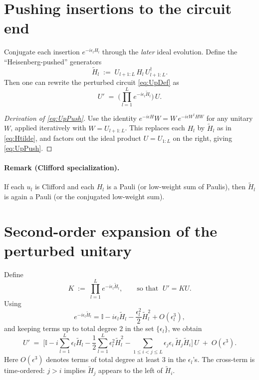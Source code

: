 \documentclass[11pt]{article}
\newcommand{\id}{\mathbb{I}}
\begin{document}
\section{Pushing insertions to the circuit end}

Conjugate each insertion $e^{-i\epsilon_l H_l}$ through the \emph{later} ideal evolution. Define the ``Heisenberg-pushed'' generators
\begin{equation}
\widetilde H_l \;:=\; U_{l+1:L}\, H_l \, U_{l+1:L}^\dagger.
\label{eq:Htilde}
\end{equation}
Then one can rewrite the perturbed circuit \eqref{eq:UpDef} as
\begin{equation}
\boxed{
U' \;=\; \Big(\prod_{l=1}^{L} e^{-i\epsilon_l \widetilde H_l}\Big)\, U.
}
\label{eq:UpPush}
\end{equation}

\begin{proof}[Derivation of \eqref{eq:UpPush}]
Use the identity $e^{-i\epsilon H}W = W\,e^{-i\epsilon W^\dagger H W}$ for any unitary $W$, applied iteratively with $W=U_{l+1:L}$. This replaces each $H_l$ by $\widetilde H_l$ as in \eqref{eq:Htilde}, and factors out the ideal product $U=U_{1:L}$ on the right, giving \eqref{eq:UpPush}.
\end{proof}

\paragraph{Remark (Clifford specialization).}
If each $u_l$ is Clifford and each $H_l$ is a Pauli (or low-weight sum of Paulis), then $\widetilde H_l$ is again a Pauli (or the conjugated low-weight sum).

\section{Second-order expansion of the perturbed unitary}

Define
\[
K \;:=\; \prod_{l=1}^{L} e^{-i\epsilon_l \widetilde H_l},
\qquad \text{so that } \; U' = K U.
\]
Using
\begin{equation}
e^{-i\epsilon_l \widetilde H_l}
= \id - i\epsilon_l \widetilde H_l - \frac{\epsilon_l^2}{2}\widetilde H_l^2 + O(\epsilon_l^3),
\label{eq:expSingle}
\end{equation}
and keeping terms up to total degree $2$ in the set $\{\epsilon_l\}$, we obtain
\begin{equation}
\boxed{
U' \;=\; \Big[
\id
- i\sum_{l=1}^{L}\epsilon_l \widetilde H_l
-\frac12\sum_{l=1}^{L}\epsilon_l^2 \widetilde H_l^2
-\sum_{1\le i<j\le L}\epsilon_j\epsilon_i\,\widetilde H_j\widetilde H_i
\Big]\,U \;+\; O(\epsilon^3).
}
\label{eq:Up2nd}
\end{equation}
Here $O(\epsilon^3)$ denotes terms of total degree at least $3$ in the $\epsilon_l$'s. The cross-term is time-ordered: $j>i$ implies $\widetilde H_j$ appears to the left of $\widetilde H_i$.
\end{document}
